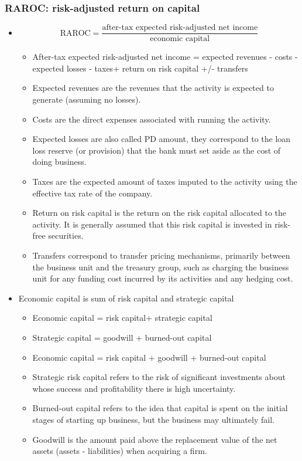 \subsubsection{RAROC: risk-adjusted return on capital}
\begin{itemize}
\item \begin{equation}
    \text{RAROC} = \frac{\text{after-tax expected risk-adjusted net income}}{\text{economic capital}}
    \end{equation}
    \begin{itemize}
    \item After-tax expected risk-adjusted net income = expected revenues - costs - expected losses - taxes+ return on risk capital +/- transfers
    \item Expected revenues are the revenues that the activity is expected to generate (assuming no losses).
    \item Costs are the direct expenses associated with running the activity.
    \item Expected losses are also called PD amount, they correspond to the loan loss reserve (or provision) that the bank must set aside as the cost of doing business.
    \item Taxes are the expected amount of taxes imputed to the activity using the effective tax rate of the company.
    \item Return on risk capital is the return on the risk capital allocated to the activity. It is generally assumed that this risk capital is invested in risk-free securities.
    \item Transfers correspond to transfer pricing mechanisms, primarily between the business unit and the treasury group, such as charging the business unit for any funding cost incurred by its activities and any hedging cost.
    \end{itemize}
\item Economic capital is sum of risk capital and strategic capital
    \begin{itemize}
    \item Economic capital = risk capital+ strategic capital
    \item Strategic capital = goodwill + burned-out capital
    \item Economic capital = risk capital + goodwill + burned-out capital
    \item Strategic risk capital refers to the risk of significant investments about whose success and profitability there is high uncertainty.
    \item Burned-out capital refers to the idea that capital is spent on the initial stages of starting up business, but the business may ultimately fail.
    \item Goodwill is the amount paid above the replacement value of the net assets (assets - liabilities) when acquiring a firm.
    \end{itemize}
\end{itemize}


